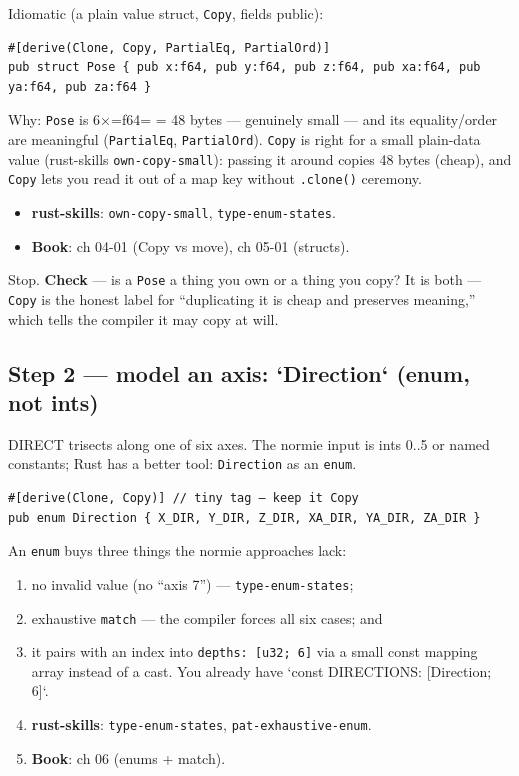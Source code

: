 \documentclass[11pt]{article}
\begin{document}
Idiomatic (a plain value struct, \texttt{Copy}, fields public):
\begin{verbatim}
#[derive(Clone, Copy, PartialEq, PartialOrd)]
pub struct Pose { pub x:f64, pub y:f64, pub z:f64, pub xa:f64, pub ya:f64, pub za:f64 }
\end{verbatim}

Why: \texttt{Pose} is 6×=f64= = 48 bytes — genuinely small — and its equality/order are
meaningful (\texttt{PartialEq}, \texttt{PartialOrd}). \texttt{Copy} is right for a small plain-data
value (rust-skills \texttt{own-copy-small}): passing it around copies 48 bytes (cheap),
and \texttt{Copy} lets you read it out of a map key without \texttt{.clone()} ceremony.

\begin{itemize}
\item \textbf{\textbf{rust-skills}}: \texttt{own-copy-small}, \texttt{type-enum-states}.
\item \textbf{\textbf{Book}}: ch 04-01 (Copy vs move), ch 05-01 (structs).
\end{itemize}

Stop. \textbf{\textbf{Check}} — is a \texttt{Pose} a thing you own or a thing you copy? It is both —
\texttt{Copy} is the honest label for ``duplicating it is cheap and preserves meaning,''
which tells the compiler it may copy at will.
\subsection{Step 2 — model an axis: `Direction` (enum, not ints)}
\label{sec:orgee4b68a}

DIRECT trisects along one of six axes. The normie input is ints 0..5 or named
constants; Rust has a better tool: \texttt{Direction} as an \texttt{enum}.

\begin{verbatim}
#[derive(Clone, Copy)] // tiny tag — keep it Copy
pub enum Direction { X_DIR, Y_DIR, Z_DIR, XA_DIR, YA_DIR, ZA_DIR }
\end{verbatim}

An \texttt{enum} buys three things the normie approaches lack:
\begin{enumerate}
\item no invalid value (no ``axis 7'') — \texttt{type-enum-states};
\item exhaustive \texttt{match} — the compiler forces all six cases; and
\item it pairs with an index into \texttt{depths: [u32; 6]} via a small const mapping
array instead of a cast. You already have `const DIRECTIONS: [Direction; 6]`.

\item \textbf{\textbf{rust-skills}}: \texttt{type-enum-states}, \texttt{pat-exhaustive-enum}.
\item \textbf{\textbf{Book}}: ch 06 (enums + match).
\end{enumerate}
\end{document}
